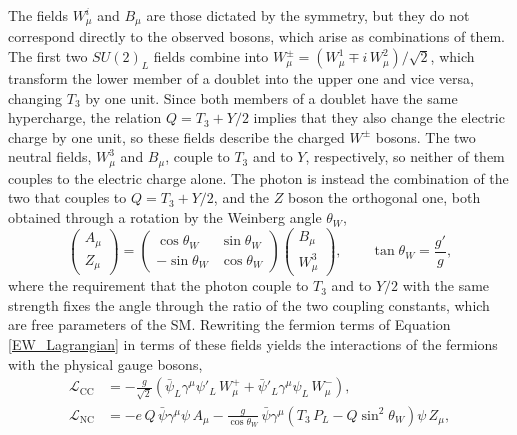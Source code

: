 The fields $W^i_\mu$ and $B_\mu$ are those dictated by the symmetry, but they do not correspond directly to the observed bosons, which arise as combinations of them. The first two $SU(2)_L$ fields combine into $W^\pm_\mu = (W^1_\mu \mp i\,W^2_\mu)/\sqrt{2}$, which transform the lower member of a doublet into the upper one and vice versa, changing $T_3$ by one unit. Since both members of a doublet have the same hypercharge, the relation $Q = T_3 + Y/2$ implies that they also change the electric charge by one unit, so these fields describe the charged $W^\pm$ bosons. The two neutral fields, $W^3_\mu$ and $B_\mu$, couple to $T_3$ and to $Y$, respectively, so neither of them couples to the electric charge alone. The photon is instead the combination of the two that couples to $Q = T_3 + Y/2$, and the $Z$ boson the orthogonal one, both obtained through a rotation by the Weinberg angle $\theta_W$,
\begin{equation}
    \begin{pmatrix} A_\mu \\ Z_\mu \end{pmatrix} = \begin{pmatrix} \cos\theta_W & \sin\theta_W \\ -\sin\theta_W & \cos\theta_W \end{pmatrix} \begin{pmatrix} B_\mu \\ W^3_\mu \end{pmatrix}, \qquad \tan\theta_W = \frac{g'}{g},
    \label{eq:weinberg_mixing}
\end{equation}
%
where the requirement that the photon couple to $T_3$ and to $Y/2$ with the same strength fixes the angle through the ratio of the two coupling constants, which are free parameters of the SM. Rewriting the fermion terms of Equation \ref{EW_Lagrangian} in terms of these fields yields the interactions of the fermions with the physical gauge bosons,
\begin{equation}
    \begin{split}
    \mathcal{L}_{\text{CC}} &= -\frac{g}{\sqrt{2}} \left(\bar{\psi}_L\gamma^\mu\psi'_L\, W^+_\mu + \bar{\psi}'_L\gamma^\mu\psi_L\, W^-_\mu\right), \\
    \mathcal{L}_{\text{NC}} &= -e\,Q\,\bar{\psi}\gamma^\mu\psi\, A_\mu - \frac{g}{\cos\theta_W}\,\bar{\psi}\gamma^\mu\left(T_3\, P_L - Q\sin^2\theta_W\right)\psi\, Z_\mu,
    \end{split}
    \label{eq:ew_currents}
\end{equation}
%
